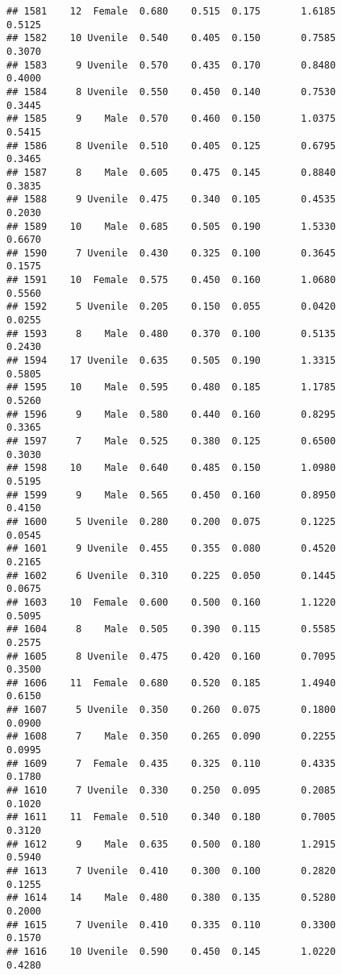 \documentclass[
]{article}
\begin{document}
\begin{verbatim}
## 1581    12  Female  0.680    0.515  0.175       1.6185         0.5125
## 1582    10 Uvenile  0.540    0.405  0.150       0.7585         0.3070
## 1583     9 Uvenile  0.570    0.435  0.170       0.8480         0.4000
## 1584     8 Uvenile  0.550    0.450  0.140       0.7530         0.3445
## 1585     9    Male  0.570    0.460  0.150       1.0375         0.5415
## 1586     8 Uvenile  0.510    0.405  0.125       0.6795         0.3465
## 1587     8    Male  0.605    0.475  0.145       0.8840         0.3835
## 1588     9 Uvenile  0.475    0.340  0.105       0.4535         0.2030
## 1589    10    Male  0.685    0.505  0.190       1.5330         0.6670
## 1590     7 Uvenile  0.430    0.325  0.100       0.3645         0.1575
## 1591    10  Female  0.575    0.450  0.160       1.0680         0.5560
## 1592     5 Uvenile  0.205    0.150  0.055       0.0420         0.0255
## 1593     8    Male  0.480    0.370  0.100       0.5135         0.2430
## 1594    17 Uvenile  0.635    0.505  0.190       1.3315         0.5805
## 1595    10    Male  0.595    0.480  0.185       1.1785         0.5260
## 1596     9    Male  0.580    0.440  0.160       0.8295         0.3365
## 1597     7    Male  0.525    0.380  0.125       0.6500         0.3030
## 1598    10    Male  0.640    0.485  0.150       1.0980         0.5195
## 1599     9    Male  0.565    0.450  0.160       0.8950         0.4150
## 1600     5 Uvenile  0.280    0.200  0.075       0.1225         0.0545
## 1601     9 Uvenile  0.455    0.355  0.080       0.4520         0.2165
## 1602     6 Uvenile  0.310    0.225  0.050       0.1445         0.0675
## 1603    10  Female  0.600    0.500  0.160       1.1220         0.5095
## 1604     8    Male  0.505    0.390  0.115       0.5585         0.2575
## 1605     8 Uvenile  0.475    0.420  0.160       0.7095         0.3500
## 1606    11  Female  0.680    0.520  0.185       1.4940         0.6150
## 1607     5 Uvenile  0.350    0.260  0.075       0.1800         0.0900
## 1608     7    Male  0.350    0.265  0.090       0.2255         0.0995
## 1609     7  Female  0.435    0.325  0.110       0.4335         0.1780
## 1610     7 Uvenile  0.330    0.250  0.095       0.2085         0.1020
## 1611    11  Female  0.510    0.340  0.180       0.7005         0.3120
## 1612     9    Male  0.635    0.500  0.180       1.2915         0.5940
## 1613     7 Uvenile  0.410    0.300  0.100       0.2820         0.1255
## 1614    14    Male  0.480    0.380  0.135       0.5280         0.2000
## 1615     7 Uvenile  0.410    0.335  0.110       0.3300         0.1570
## 1616    10 Uvenile  0.590    0.450  0.145       1.0220         0.4280

\end{verbatim}
\end{document}

